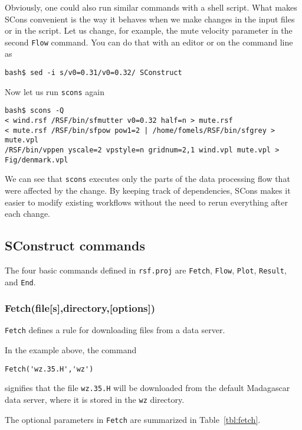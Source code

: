 Obviously, one could also run similar commands with a shell script. What makes SCons convenient is the way it behaves when we make changes in the input files or in the script. Let us change, for example, the mute velocity parameter in the second \texttt{Flow} command. You can do that with an editor or on the command line as

\begin{verbatim}
bash$ sed -i s/v0=0.31/v0=0.32/ SConstruct
\end{verbatim}

Now let us run \texttt{scons} again

\begin{verbatim}
bash$ scons -Q
< wind.rsf /RSF/bin/sfmutter v0=0.32 half=n > mute.rsf
< mute.rsf /RSF/bin/sfpow pow1=2 | /home/fomels/RSF/bin/sfgrey > mute.vpl
/RSF/bin/vppen yscale=2 vpstyle=n gridnum=2,1 wind.vpl mute.vpl > Fig/denmark.vpl
\end{verbatim}

We can see that \texttt{scons} executes only the parts of the data
processing flow that were affected by the change. By keeping track of
dependencies, SCons makes it easier to modify existing workflows
without the need to rerun everything after each change.

\subsection{SConstruct commands}

The four basic commands defined in \texttt{rsf.proj} are \texttt{Fetch}, \texttt{Flow}, \texttt{Plot}, \texttt{Result}, and \texttt{End}.

\subsubsection{Fetch(file[s],directory,[options])}

\texttt{Fetch} defines a rule for downloading files from a data server.

In the example above, the command
\begin{lstlisting}
Fetch('wz.35.H','wz')
\end{lstlisting}
signifies that the file \texttt{wz.35.H} will be downloaded from the default Madagascar data server, where it is stored in the \texttt{wz} directory.

The optional parameters in \texttt{Fetch} are summarized in Table~\ref{tbl:fetch}.


